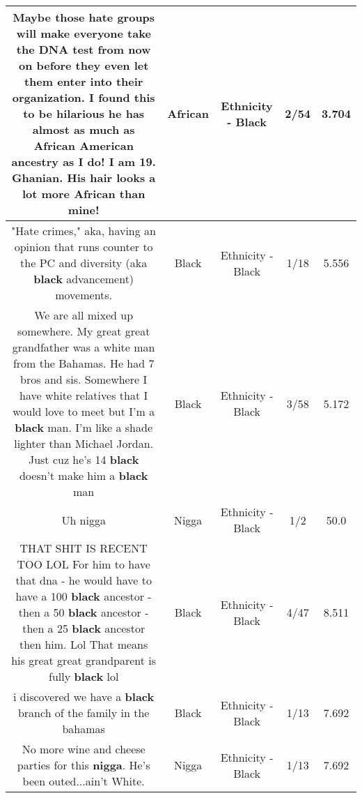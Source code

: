 \documentclass[11pt]{article}
\newlength\mylength
\begin{document}
\begin{center}
\begin{longtable}{|C{.65\mylength}|C{.30\mylength}|C{.12\mylength}|C{.12\mylength}|C{.12\mylength}|}
  \small Maybe those hate groups will make everyone take the DNA test from now on before they even let them enter into their organization. I found this to be hilarious he has almost as much as \textbf{African} American ancestry as I do! I am 19. Ghanian. His hair looks a lot more \textbf{African} than mine!\normalsize   & African & Ethnicity - Black & 2/54 & 3.704 \\  \hline
  \small "Hate crimes," aka, having an opinion that runs counter to the PC and diversity (aka \textbf{black} advancement) movements.\normalsize   & Black & Ethnicity - Black & 1/18 & 5.556 \\  \hline
  \small We are all mixed up somewhere. My great great grandfather was a white man from the Bahamas. He had 7 bros and sis. Somewhere I have white relatives that I would love to meet but I'm a \textbf{black} man. I'm like a shade lighter than Michael Jordan. Just cuz he's 14 \textbf{black} doesn't make him a \textbf{black} man\normalsize   & Black & Ethnicity - Black & 3/58 & 5.172 \\  \hline
  \small Uh nigga\normalsize   & Nigga & Ethnicity - Black & 1/2 & 50.0 \\  \hline
  \small THAT SHIT IS RECENT TOO LOL For him  to have that dna - he would have to have a 100 \textbf{black}  ancestor - then a 50 \textbf{black} ancestor - then a 25 \textbf{black} ancestor then him. Lol That means his great great grandparent is fully \textbf{black} lol\normalsize   & Black & Ethnicity - Black & 4/47 & 8.511 \\  \hline
  \small i discovered we have a \textbf{black} branch of the family in the bahamas\normalsize   & Black & Ethnicity - Black & 1/13 & 7.692 \\  \hline
  \small No more wine and cheese parties for this \textbf{nigga}. He's been outed...ain't White.\normalsize   & Nigga & Ethnicity - Black & 1/13 & 7.692 \\  \hline

\end{longtable}
\end{center}
\end{document}
